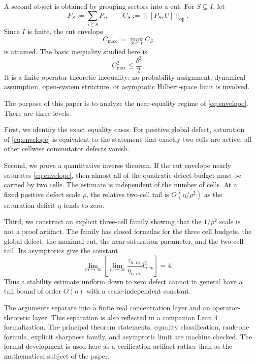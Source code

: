 \documentclass[11pt]{article}
\newcommand{\op}{\mathrm{op}}
\newcommand{\cmax}{C_{\max}}
\newcommand{\dd}{\delta}
\newcommand{\etaq}{\eta}
\newcommand{\tauq}{\tau}
\begin{document}
A second object is obtained by grouping sectors into a cut.  For
$S\subseteq I$, let
\[
  P_S:=\sum_{i\in S}P_i,\qquad
  C_S:=\|[P_S,U]\|_{\op}.
\]
Since $I$ is finite, the cut envelope
\[
  \cmax:=\max_{S\subseteq I}C_S
\]
is attained.  The basic inequality studied here is
\begin{equation}\label{eq:envelope}
  \cmax^2\le \frac{\dd^2}{2}.
\end{equation}
It is a finite operator-theoretic inequality: no probability assignment,
dynamical assumption, open-system structure, or asymptotic Hilbert-space
limit is involved.

The purpose of this paper is to analyze the near-equality regime of
\eqref{eq:envelope}.  There are three levels.

First, we identify the exact equality cases.  For positive global defect,
saturation of \eqref{eq:envelope} is equivalent to the statement that exactly
two cells are active: all other cellwise commutator defects vanish.

Second, we prove a quantitative inverse theorem.  If the cut envelope nearly
saturates \eqref{eq:envelope}, then almost all of the quadratic defect budget
must be carried by two cells.  The estimate is independent of the number of
cells.  At a fixed positive defect scale $\rho$, the relative two-cell tail is
$O(\etaq/\rho^2)$ as the saturation deficit $\etaq$ tends to zero.

Third, we construct an explicit three-cell family showing that the
$1/\rho^2$ scale is not a proof artifact.  The family has closed formulas for
the three cell budgets, the global defect, the maximal cut, the
near-saturation parameter, and the two-cell tail.  Its asymptotics give the
constant
\[
  \lim_{m\to\infty}\left[
    \lim_{n\to\infty}\frac{\tauq_{n,m}}{\etaq_{n,m}}\dd_{n,m}^2
  \right]=4.
\]
Thus a stability estimate uniform down to zero defect cannot in general have
a tail bound of order $O(\etaq)$ with a scale-independent constant.

The arguments separate into a finite real concentration layer and an
operator-theoretic layer.  This separation is also reflected in a companion
Lean 4 formalization.  The principal theorem statements, equality
classification, rank-one formula, explicit sharpness family, and asymptotic
limit are machine checked.  The formal development is used here as a
verification artifact rather than as the mathematical subject of the paper.
\end{document}
